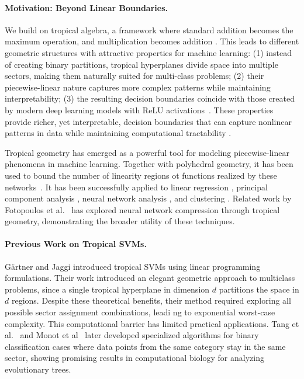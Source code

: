 \documentclass{article}
\begin{document}
\paragraph{Motivation: Beyond Linear Boundaries.} We build on tropical algebra, a framework where standard addition becomes the maximum operation, and multiplication becomes addition \cite{maclagan2015}. This leads to different geometric structures with attractive properties for machine learning: (1) instead of creating binary partitions, tropical hyperplanes divide space into multiple sectors, making them naturally suited for multi-class problems; (2) their piecewise-linear nature captures more complex patterns while maintaining interpretability; (3) the resulting decision boundaries coincide with those created by modern deep learning models with ReLU activations~\cite{zhang2018}. These properties provide richer, yet interpretable, decision boundaries that can capture nonlinear patterns in data while maintaining computational tractability \cite{maragos2021}.

Tropical geometry has emerged as a powerful tool for modeling piecewise-linear phenomena in machine learning. Together with polyhedral geometry,
it has been used to bound the number of linearity regions ot functions realized by these networks~\cite{zhang2018,montufar}.
It has been successfully applied to linear regression \cite{maragos2020,akian2020}, principal component analysis \cite{yoshida2019}, neural network analysis \cite{maragos2021}, and clustering \cite{monod2022}. Related work by Fotopoulos et al.~\cite{fotopoulos2024} has explored neural network compression through tropical geometry, demonstrating the broader utility of these techniques.

\paragraph{Previous Work on Tropical SVMs.} Gärtner and Jaggi \cite{gartner2008} introduced tropical SVMs using linear programming formulations. Their work introduced an elegant geometric approach to multiclass problems, since a single tropical hyperplane in dimension $d$ partitions the space in $d$ regions.
Despite these theoretical benefits, their method required exploring all possible sector assignment combinations, leadi
ng to exponential worst-case complexity. This computational barrier has limited practical applications.
Tang et al.~\cite{tang2020} and Monot et al~\cite{monod2022} later developed specialized algorithms for binary classification cases where data points from the same category stay in the same sector, showing promising results in computational biology for analyzing evolutionary trees.
\end{document}
